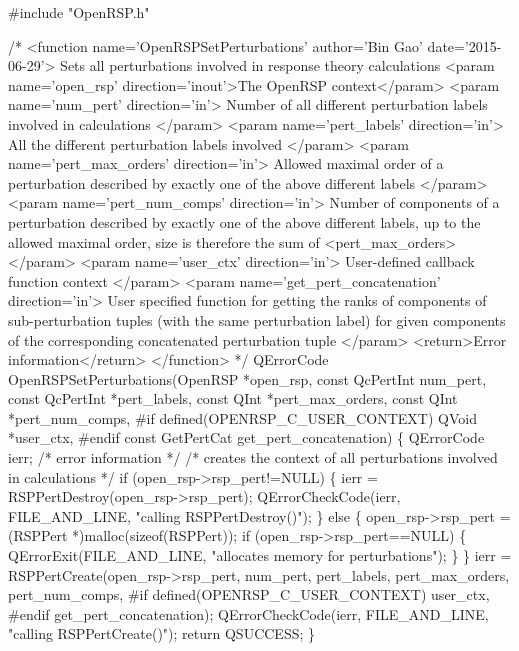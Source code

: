 #include "OpenRSP.h"

/* <function name='OpenRSPSetPerturbations' author='Bin Gao' date='2015-06-29'>
     Sets all perturbations involved in response theory calculations
     <param name='open_rsp' direction='inout'>The OpenRSP context</param>
     <param name='num_pert' direction='in'>
       Number of all different perturbation labels involved in calculations
     </param>
     <param name='pert_labels' direction='in'>
       All the different perturbation labels involved
     </param>
     <param name='pert_max_orders' direction='in'>
       Allowed maximal order of a perturbation described by exactly one of
       the above different labels
     </param>
     <param name='pert_num_comps' direction='in'>
       Number of components of a perturbation described by exactly one of
       the above different labels, up to the allowed maximal order, size
       is therefore the sum of <pert_max_orders>
     </param>
     <param name='user_ctx' direction='in'>
       User-defined callback function context
     </param>
     <param name='get_pert_concatenation' direction='in'>
       User specified function for getting the ranks of components of
       sub-perturbation tuples (with the same perturbation label) for given
       components of the corresponding concatenated perturbation tuple
     </param>
     <return>Error information</return>
   </function> */
QErrorCode OpenRSPSetPerturbations(OpenRSP *open_rsp,
                                   const QcPertInt num_pert,
                                   const QcPertInt *pert_labels,
                                   const QInt *pert_max_orders,
                                   const QInt *pert_num_comps,
#if defined(OPENRSP_C_USER_CONTEXT)
                                   QVoid *user_ctx,
#endif
                                   const GetPertCat get_pert_concatenation)
\{
    QErrorCode ierr;  /* error information */
    /* creates the context of all perturbations involved in calculations */
    if (open_rsp->rsp_pert!=NULL) \{
        ierr = RSPPertDestroy(open_rsp->rsp_pert);
        QErrorCheckCode(ierr, FILE_AND_LINE, "calling RSPPertDestroy()");
    \}
    else \{
        open_rsp->rsp_pert = (RSPPert *)malloc(sizeof(RSPPert));
        if (open_rsp->rsp_pert==NULL) \{
            QErrorExit(FILE_AND_LINE, "allocates memory for perturbations");
        \}
    \}
    ierr = RSPPertCreate(open_rsp->rsp_pert,
                         num_pert,
                         pert_labels,
                         pert_max_orders,
                         pert_num_comps,
#if defined(OPENRSP_C_USER_CONTEXT)
                         user_ctx,
#endif
                         get_pert_concatenation);
    QErrorCheckCode(ierr, FILE_AND_LINE, "calling RSPPertCreate()");
    return QSUCCESS;
\}
\nwendcode{}\nwdocspar

